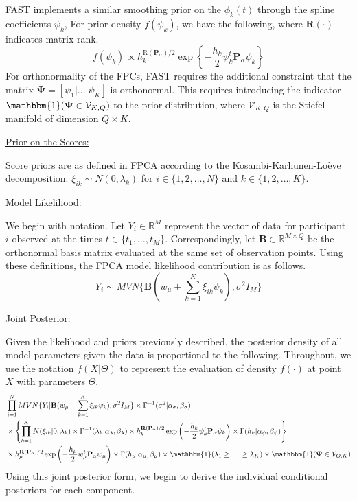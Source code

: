 \documentclass[12pt]{article}
\begin{document}
FAST implements a similar smoothing prior on the $\phi_k(t)$ through the spline coefficients $\psi_k$, For prior density $f(\psi_k)$, we have the following, where $\mathbf{R}(\cdot)$ indicates matrix rank.
$$f(\psi_k) \propto h_k^{\text{R}(\mathbf{P}_\alpha)/2}\exp\left\{-\frac{h_k}{2} \psi^t_k\mathbf{P}_{\alpha}\psi_k\right\}$$
For orthonormality of the FPCs, FAST requires the additional constraint that the matrix $\boldsymbol{\Psi} = [\psi_1| \ldots| \psi_K]$ is orthonormal. This requires introducing the indicator $\mathbbm{1}(\boldsymbol{\Psi} \in \mathcal{V}_{K,Q})$ to the prior distribution, where $\mathcal{V}_{K,Q}$ is the Stiefel manifold of dimension $Q \times K$.

\vspace{0.5em}
\underline{Prior on the Scores:}

Score priors are as defined in FPCA according to the Kosambi-Karhunen-Loève decomposition: $\xi_{ik} \sim N(0, \lambda_k)$ for $i \in \{1,2,\ldots, N\}$ and $k \in \{1,2,\ldots, K\}$.

\vspace{0.5em}
\underline{Model Likelihood:}

We begin with notation. Let $Y_i \in \mathbb{R}^M$ represent the vector of data for participant $i$ observed at the times $t \in \{t_1, \ldots, t_M\}$. Correspondingly, let $\mathbf{B} \in \mathbb{R}^{M \times Q}$ be the orthonormal basis matrix evaluated at the same set of observation points. Using these definitions, the FPCA model likelihood contribution is as follows.
$$Y_i \sim MVN\{\mathbf{B}(w_\mu + \sum_{k = 1}^K \xi_{ik} \psi_k), \sigma^2I_M\}$$

\vspace{0.5em}
\underline{Joint Posterior:}

Given the likelihood and priors previously described, the posterior density of all model parameters given the data is proportional to the following. Throughout, we use the notation $f(X|\Theta)$ to represent the evaluation of density $f(\cdot)$ at point $X$ with parameters $\Theta$.
\begin{equation*}
        \begin{split}
        &\prod_{i = 1}^N MVN\{Y_i|\mathbf{B}(w_{\mu} + \sum_{k = 1}^K \xi_{ik} \psi_{k}), \sigma^2 I_M\} \times \Gamma^{-1}(\sigma^2|\alpha_{\sigma}, \beta_{\sigma}) \\
         &\times \left\{\prod_{k = 1}^K N(\xi_{ik}|0, \lambda_k) \times \Gamma^{-1}(\lambda_k|\alpha_{\lambda}, \beta_{\lambda}) \times h_k^{\mathbf{R}(\mathbf{P}_\alpha)/2}\exp\left(-\frac{h_k}{2}\psi_k^t\mathbf{P}_{\alpha}\psi_k\right)\times \Gamma(h_k|\alpha_{\psi}, \beta_{\psi}) \right\}  \\
        &\times h_\mu^{\mathbf{R}(\mathbf{P}_\alpha)/2}\exp\left(-\frac{h_{\mu}}{2} w^t_{\mu}\mathbf{P}_{\alpha} w_{\mu}\right) \times \Gamma(h_{\mu}|\alpha_{\mu}, \beta_{\mu})\times \mathbbm{1}(\lambda_1 \geq \ldots \geq \lambda_K) \times \mathbbm{1}(\mathbf{\Psi} \in \mathcal{V}_{Q, K})
        \end{split}
        \label{EQ:Posterior}
\end{equation*}
Using this joint posterior form, we begin to derive the individual conditional posteriors for each component.
\end{document}
